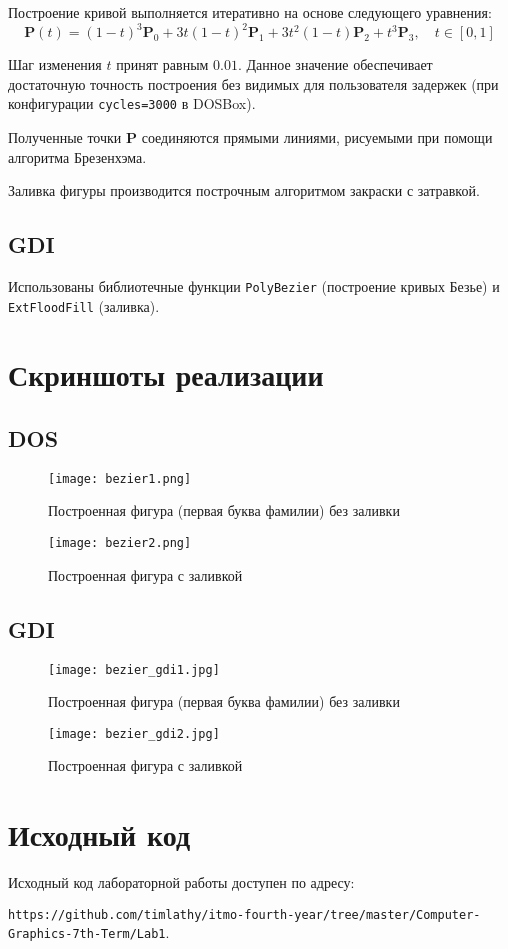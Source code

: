 \documentclass[listings]{labreport}
\begin{document}
Построение кривой выполняется итеративно на основе следующего уравнения:
\[
{\mathbf{P}}(t)=(1-t)^{3}{\mathbf{P}}_{0}+3t(1-t)^{2}{\mathbf{P}}_{1}+3t^{2}(1-t){\mathbf{P}}_{2}+t^{3}{\mathbf{P}}_{3},\quad t\in [0,1]
\]

Шаг изменения $t$ принят равным $0.01$. Данное значение обеспечивает достаточную точность
построения без видимых для пользователя задержек (при конфигурации \verb|cycles=3000| в DOSBox).

Полученные точки $\mathbf{P}$ соединяются прямыми линиями, рисуемыми при помощи\\
алгоритма Брезенхэма.

Заливка фигуры производится построчным алгоритмом закраски с затравкой.

\subsection*{GDI}

Использованы библиотечные функции \verb|PolyBezier| (построение кривых Безье) и\\
\verb|ExtFloodFill| (заливка).

\section*{Скриншоты реализации}

\subsection*{DOS}

\begin{figure}[h!]
\centering
\texttt{[image: bezier1.png]}
\caption{Построенная фигура (первая буква фамилии) без заливки}
\end{figure}

\begin{figure}[h!]
\centering
\texttt{[image: bezier2.png]}
\caption{Построенная фигура с заливкой}
\end{figure}

\newpage
\subsection*{GDI}

\begin{figure}[h!]
\centering
\texttt{[image: bezier\_gdi1.jpg]}
\caption{Построенная фигура (первая буква фамилии) без заливки}
\end{figure}

\begin{figure}[h!]
\centering
\texttt{[image: bezier\_gdi2.jpg]}
\caption{Построенная фигура с заливкой}
\end{figure}

\section*{Исходный код}

Исходный код лабораторной работы доступен по адресу:

\verb|https://github.com/timlathy/itmo-fourth-year/tree/master/Computer-Graphics-7th-Term/Lab1|.
\end{document}
